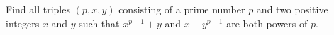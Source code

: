 Find all triples $(p, x, y)$ consisting of a prime number $p$ and two positive integers $x$ and $y$ such that $x^{p-1} + y$ and $x + y^{p-1}$ are both powers of $p$.
